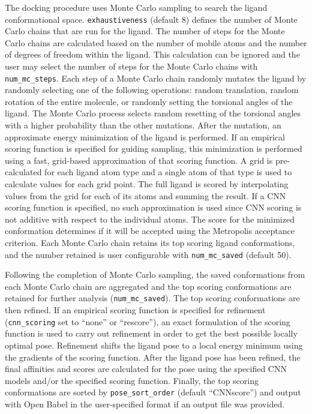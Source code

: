 \documentclass[journal=jcisd8,manuscript=article]{achemso}
\begin{document}
The docking procedure uses Monte Carlo sampling to search the ligand conformational space. \texttt{exhaustiveness} (default 8) defines the number of Monte Carlo chains that are run for the ligand. The number of steps for the Monte Carlo chains are calculated based on the number of mobile atoms and the number of degrees of freedom within the ligand. This calculation can be ignored and the user may select the number of steps for the Monte Carlo chains with \texttt{num\_mc\_steps}. Each step of a Monte Carlo chain randomly mutates the ligand by randomly selecting one of the following operations: random translation, random rotation of the entire molecule, or randomly setting the torsional angles of the ligand. The Monte Carlo process selects random resetting of the torsional angles with a higher probability than the other mutations. After the mutation, an approximate energy minimization of the ligand is performed. If an empirical scoring function is specified for guiding sampling, this minimization is performed using a fast, grid-based approximation of that scoring function. A grid is pre-calculated for each ligand atom type and a single atom of that type is used to calculate values for each grid point.  The full ligand is scored by interpolating values from the grid for each of its atoms and summing the result.  If a CNN scoring function is specified, no such approximation is used since CNN scoring is not additive with respect to the individual atoms\cite{hochuli2018visualizing}.
 The score for the minimized conformation determines if it will be accepted using the Metropolis acceptance criterion. Each Monte Carlo chain retains its top scoring ligand conformations, and the number retained is user configurable with \texttt{num\_mc\_saved} (default 50).

Following the completion of Monte Carlo sampling, the saved conformations from each Monte Carlo chain are aggregated and the top scoring conformations are retained for further analysis (\texttt{num\_mc\_saved}). The top scoring conformations are then refined. If an empirical scoring function is specified for refinement (\texttt{cnn\_scoring} set to ``none'' or ``rescore''), an exact formulation of the scoring function is used to carry out refinement in order to get the best possible locally optimal pose. Refinement shifts the ligand pose to a local energy minimum using the gradients of the scoring function. After the ligand pose has been refined, the final affinities and scores are calculated for the pose using the specified CNN models and/or the specified scoring function. Finally, the top scoring conformations are sorted by \texttt{pose\_sort\_order} (default ``CNNscore'') and output with Open Babel in the user-specified format if an output file was provided.
\end{document}
